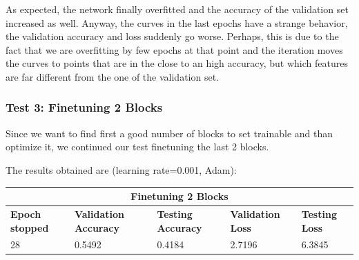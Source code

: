 As expected, the network finally overfitted and the accuracy of the validation set increased as well. Anyway, the curves in the last epochs have a strange behavior, the validation accuracy and loss suddenly go worse. Perhaps, this is due to the fact that we are overfitting by few epochs at that point and the iteration moves the curves to points that are in the close to an high accuracy, but which features are far different from the one of the validation set.



\subsubsection{Test 3: Finetuning 2 Blocks}
Since we want to find first a good number of blocks to set trainable and than optimize it, we continued our test finetuning the last 2 blocks.

\noindent The results obtained are (learning rate=0.001, Adam):

\medskip

\begin{tabular}{ |p{2cm}|p{2cm}|p{2cm}|p{2cm}|p{2cm}|  }
\hline
\multicolumn{5}{|c|}{Finetuning 2 Blocks} \\
\hline
\textbf{Epoch stopped} & \textbf{Validation Accuracy} & \textbf{Testing Accuracy} & \textbf{Validation Loss} & \textbf{Testing Loss} \\
\hline
28 & 0.5492 & 0.4184 & 2.7196 & 6.3845\\
\hline
\end{tabular}

